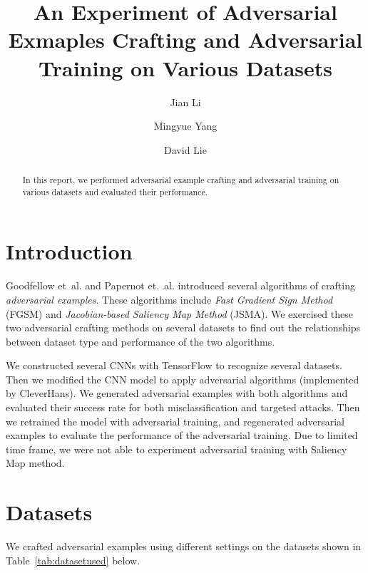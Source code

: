 \documentclass{article}
\begin{document}
\title{An Experiment of Adversarial Exmaples Crafting and Adversarial Training on Various Datasets}
\author{Jian Li \and Mingyue Yang \and David Lie}
\maketitle

\begin{abstract}
In this report, we performed adversarial example crafting and adversarial training on various datasets and evaluated their performance.
\end{abstract}

\section{Introduction}

Goodfellow et\ al. and Papernot et.\ al. introduced several algorithms of crafting \emph{adversarial examples}.
These algorithms include \emph{Fast Gradient Sign Method} (FGSM)\cite{goodfellow2015} and \emph{Jacobian-based Saliency Map Method} (JSMA)\cite{papernot2015}.
We exercised these two adversarial crafting methods on several datasets to find out the relationships between dataset type and performance of the two algorithms.

We constructed several CNNs with TensorFlow\cite{tensorflow} to recognize several datasets.
Then we modified the CNN model to apply adversarial algorithms (implemented by CleverHans\cite{cleverhans}).
We generated adversarial examples with both algorithms and evaluated their success rate for both misclassification and targeted attacks.
Then we retrained the model with adversarial training, and regenerated adversarial examples to evaluate the performance of the adversarial training. Due to limited time frame, we were not able to experiment adversarial training with Saliency Map method.

\section{Datasets}

We crafted adversarial examples using different settings on the datasets shown in Table~\ref{tab:datasetused} below.
\end{document}
